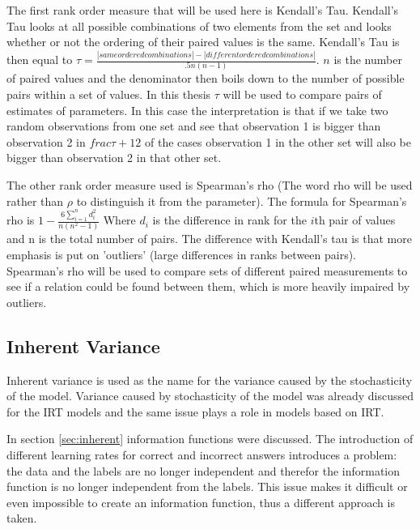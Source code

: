 \documentclass{scrartcl}
\begin{document}
The first rank order measure that will be used here is Kendall's Tau. Kendall's Tau looks at all possible combinations of two elements from the set and looks whether or not the ordering of their paired values is the same. Kendall's Tau is then equal to $\tau=\frac{|same ordered combinations|-|different ordered combinations|}{.5 n (n-1)}$. $n$ is the number of paired values and the  denominator then boils down to the number of possible pairs within a set of values. In this thesis $\tau$ will be used to compare pairs of estimates of parameters. In this case the interpretation is that if we take two random observations from one set and see that observation 1 is bigger than observation 2 in $frac{\tau+1}{2}$ of the cases observation 1 in the other set will also be bigger than observation 2 in that other set.

The other rank order measure used is Spearman's rho (The word rho will be used rather than $\rho$ to distinguish it from the parameter). The formula for Spearman's rho is $1-\frac{6 \sum\limits_{i=1}^n d_{i}^{2}}{n(n^{2}-1)}$ Where $d_{i}$ is the difference in rank for the $i$th pair of values and n is the total number of pairs. The difference with Kendall's tau is that more emphasis is put on 'outliers' (large differences in ranks between pairs). Spearman's rho will be used to compare sets of different paired measurements to see if a relation could be found between them, which is more heavily impaired by outliers.

\subsection{Inherent Variance}
Inherent variance is used as the name for the variance caused by the stochasticity of the model. Variance caused by stochasticity of the model was already discussed for the IRT models and the same issue plays a role in models based on IRT.

In section \ref{sec:inherent} information functions were discussed. The introduction of different learning rates for correct and incorrect answers introduces a problem: the data and the labels are no longer independent and therefor the information function is no longer independent from the labels. This issue makes it difficult or even impossible to create an information function, thus a different approach is taken.
\end{document}
